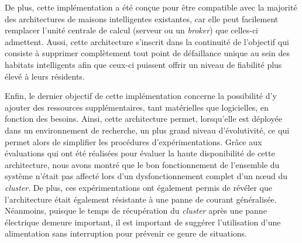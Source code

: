 De plus, cette implémentation a été conçue pour être compatible avec la majorité des architectures de maisons intelligentes existantes, car elle peut facilement remplacer l'unité centrale de calcul (serveur ou un \textit{broker}) que celles-ci admettent. Aussi, cette architecture s'inscrit dans la continuité de l'objectif qui consiste à supprimer complètement tout point de défaillance unique au sein des habitats intelligents afin que ceux-ci puissent offrir un niveau de fiabilité plus élevé à leurs résidents.

Enfin, le dernier objectif de cette implémentation concerne la possibilité d'y ajouter des ressources supplémentaires, tant matérielles que logicielles, en fonction des besoins. Ainsi, cette architecture permet, lorsqu'elle est déployée dans un environnement de recherche, un plus grand niveau d'évolutivité, ce qui permet alors de simplifier les procédures d'expérimentations. Grâce aux évaluations qui ont été réalisées pour évaluer la haute disponibilité de cette architecture, nous avons montré que le bon fonctionnement de l'ensemble du système n'était pas affecté lors d'un dysfonctionnement complet d'un n\oe{}ud du \textit{cluster}. De plus, ces expérimentations ont également permis de révéler que l'architecture était également résistante à une panne de courant généralisée. Néanmoins, puisque le temps de récupération du \textit{cluster} après une panne électrique demeure important, il est important de suggérer l'utilisation d'une alimentation sans interruption pour prévenir ce genre de situations.

